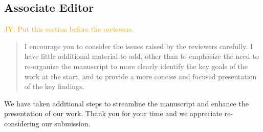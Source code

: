 \documentclass[12pt]{article}
\newcommand{\jy}[1]{\textcolor{orange}{JY: #1}}
\newenvironment{comment}%
{\begin{quotation}\noindent\small\it\color{darkblue}\ignorespaces%
}{\end{quotation}}
\begin{document}
\subsection*{Associate Editor}
\jy{Put this section before the reviewers.}

\begin{comment}
I encourage you to consider the issues raised by the reviewers carefully. I have
little additional material to add, other than to emphasize the need to
re-organize the manuscript to more clearly identify the key goals of the work at
the start, and to provide a more concise and focused presentation of the key
findings.
\end{comment}


We have taken additional steps to streamline the manuscript and enhance the
presentation of our work. Thank you for your time and we appreciate re-considering
our submission.


%
%
\end{document}
